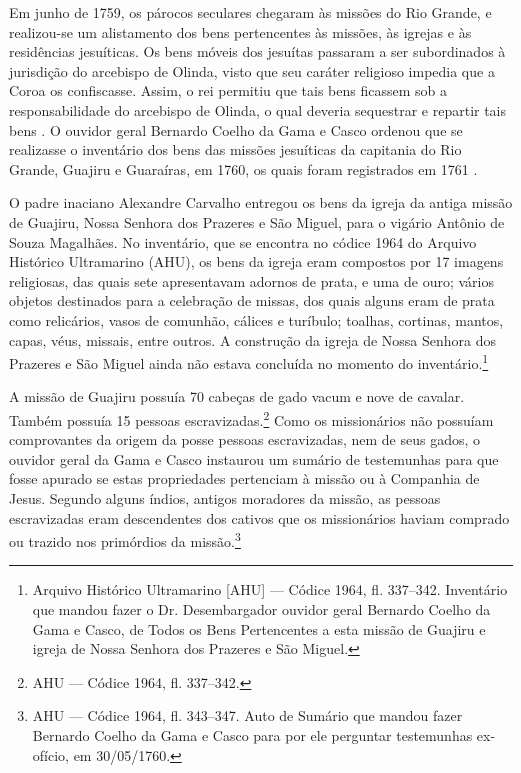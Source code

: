 \begin{refsection}
Em junho de 1759, os párocos seculares chegaram às missões do Rio Grande, e realizou-se um alistamento dos bens pertencentes às missões, às igrejas e às residências jesuíticas. Os bens móveis dos jesuítas passaram a ser subordinados à jurisdição do arcebispo de Olinda, visto que seu caráter religioso impedia que a Coroa os confiscasse. Assim, o rei permitiu que tais bens ficassem sob a responsabilidade do arcebispo de Olinda, o qual deveria sequestrar e repartir tais bens \cite[p.~29--35]{Couto1990}. O ouvidor geral Bernardo Coelho da Gama e Casco ordenou que se realizasse o inventário dos bens das missões jesuíticas da capitania do Rio Grande, Guajiru e Guaraíras, em 1760, os quais foram registrados em 1761 \cite[p.~172]{Lopes2005}. 

O padre inaciano Alexandre Carvalho entregou os bens da igreja da antiga missão de Guajiru, Nossa Senhora dos Prazeres e São Miguel, para o vigário Antônio de Souza Magalhães. No inventário, que se encontra no códice 1964 do Arquivo Histórico Ultramarino (AHU), os bens da igreja eram compostos por 17 imagens religiosas, das quais sete apresentavam adornos de prata, e uma de ouro; vários objetos destinados para a celebração de missas, dos quais alguns eram de prata como relicários, vasos de comunhão, cálices e turíbulo; toalhas, cortinas, mantos, capas, véus, missais, entre outros. A construção da igreja de Nossa Senhora dos Prazeres e São Miguel ainda não estava concluída no momento do inventário.\footnote{Arquivo Histórico Ultramarino [AHU] --- Códice 1964, fl. 337--342. Inventário que mandou fazer o Dr. Desembargador ouvidor geral Bernardo Coelho da Gama e Casco, de Todos os Bens Pertencentes a esta missão de Guajiru e igreja de Nossa Senhora dos Prazeres e São Miguel.} 

A missão de Guajiru possuía 70 cabeças de gado vacum e nove de cavalar. Também possuía 15 pessoas escravizadas.\footnote{AHU --- Códice 1964, fl. 337--342.} Como os missionários não possuíam comprovantes da origem da posse pessoas escravizadas, nem de seus gados, o ouvidor geral da Gama e Casco instaurou um sumário de testemunhas para que fosse apurado se estas propriedades pertenciam à missão ou à Companhia de Jesus. Segundo alguns índios, antigos moradores da missão, as pessoas escravizadas eram descendentes dos cativos que os missionários haviam comprado ou trazido nos primórdios da missão.\footnote{AHU --- Códice 1964, fl. 343--347. Auto de Sumário que mandou fazer Bernardo Coelho da Gama e Casco para por ele perguntar testemunhas ex-ofício, em 30/05/1760.} 


\end{refsection}
